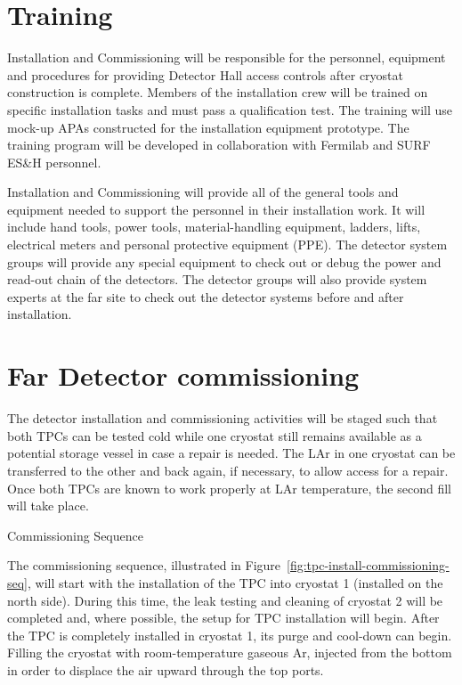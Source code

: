 \section{Training}
\label{fd:install:training}

Installation and Commissioning will be responsible for the personnel, equipment and procedures for providing Detector Hall access controls after cryostat construction is complete. Members of the installation crew will be 
trained on specific installation tasks and must pass a qualification test. The training will use mock-up APAs constructed for the installation equipment prototype. The training program will be developed in collaboration with Fermilab and SURF ES\&H personnel. 

Installation and Commissioning will provide all of the general tools and equipment needed to support the personnel in their installation work. It will include hand tools, power tools, material-handling equipment, ladders, 
lifts, electrical meters and personal protective equipment (PPE). The detector system groups will provide any special equipment to check out or debug the power and read-out chain of the detectors. The detector groups will also provide system experts at the far site to check out the detector systems before and after installation. 

\section{Far Detector commissioning}
\label{fd:install:commissioning}

The detector installation and commissioning activities will be staged such that both TPCs can be tested cold while one cryostat still remains available as a potential storage vessel in case a repair is needed. The LAr in one cryostat can be transferred to the other and back again, if necessary, to allow access for a repair. Once both TPCs are known to work properly at LAr temperature, the second fill will take place. 

Commissioning Sequence

The commissioning sequence, illustrated in Figure~\ref{fig:tpc-install-commissioning-seq}, will start with the installation of the TPC into cryostat 1 (installed on the north side). During this time, the leak testing and cleaning of cryostat 2 will be completed and, 
where possible, the setup for TPC installation will begin. After the TPC is completely installed in cryostat 1, its purge and cool-down can begin. %
Filling the cryostat with room-temperature gaseous Ar, injected from the bottom in order to displace the air upward through the top ports. 

